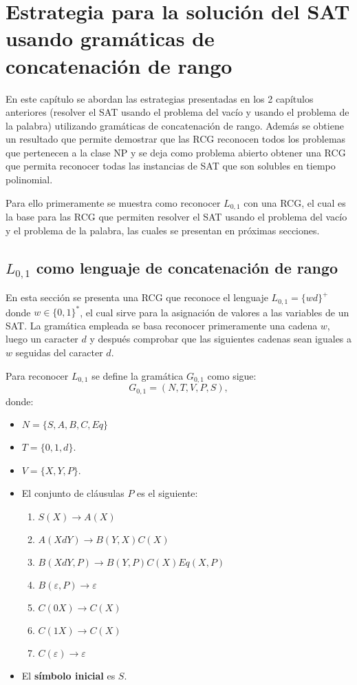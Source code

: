 \chapter{Estrategia para la solución del SAT usando gramáticas de concatenación de rango}

En este capítulo se abordan las estrategias presentadas en los 2 capítulos anteriores
(resolver el SAT usando el problema del vacío y usando el problema de la palabra)
utilizando gramáticas de concatenación
de rango. Además se obtiene un resultado que permite demostrar que las RCG reconocen
todos los problemas que pertenecen a la clase NP y se deja como problema abierto
obtener una RCG que permita reconocer todas las instancias de SAT que son solubles en
tiempo polinomial.

Para ello primeramente se muestra como reconocer $L_{0,1}$ con una RCG, el cual es la base para las RCG que permiten
resolver el SAT usando el problema del vacío y el problema de la palabra, las cuales se presentan en próximas
secciones.

\section{$L_{0,1}$ como lenguaje de concatenación de rango}

En esta sección se presenta una RCG que reconoce el lenguaje $L_{0,1}=\{wd\}^+$ donde $w\in \{0,1\}^*$, el cual sirve para la asignación de valores a las variables de un SAT. La gramática empleada se basa reconocer
primeramente una cadena $w$, luego un caracter $d$ y después comprobar que las siguientes cadenas sean iguales a $w$ seguidas
del caracter $d$.

Para reconocer $L_{0,1}$ se define la gramática $G_{0,1}$ como sigue:
\[
    G_{0,1} = (N, T, V, P, S),
\]
donde:

\begin{itemize}
    \item $N=\{S,A,B,C,Eq\}$
    \item $T=\{0,1,d\}$.
    \item $V=\{X,Y,P\}$.
    \item El conjunto de cláusulas $P$ es el siguiente:
          \begin{enumerate}
              \item $S(X)\to A(X)$
              \item $A(XdY)\to B(Y,X)C(X)$
              \item $B(XdY,P)\to B(Y,P) C(X) Eq(X,P)$
              \item $B(\varepsilon,P)\to \varepsilon$
              \item $C(0X)\to C(X)$
              \item $C(1X)\to C(X)$
              \item $C(\varepsilon)\to \varepsilon$
          \end{enumerate}
    \item El \textbf{símbolo inicial} es $S$.
\end{itemize}

